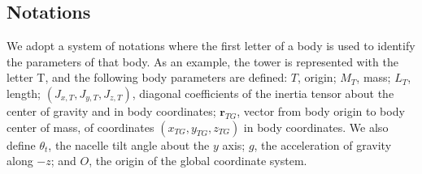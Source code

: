\documentclass[wes, manuscript]{copernicus}
\renewcommand{\v}[1]{\boldsymbol{#1}}
\begin{document}
\subsection{Notations}
We adopt a system of notations where the first letter of a body is used to identify the parameters of that body.
As an example, the tower is represented with the letter T, and the following body parameters are defined: $T$, origin; $M_T$, mass; $L_T$, length; $(J_{x,T}, J_{y,T}, J_{z,T})$, diagonal coefficients of the inertia tensor about the center of gravity and in body coordinates; $\v{r}_{TG}$, vector from body origin to body center of mass, of coordinates $(x_{TG},y_{TG},z_{TG})$ in body coordinates. 
We also define $\theta_t$, the nacelle tilt angle about the $y$ axis; $g$, the acceleration of gravity along $-z$; and $O$, the origin of the global coordinate system.
\end{document}
